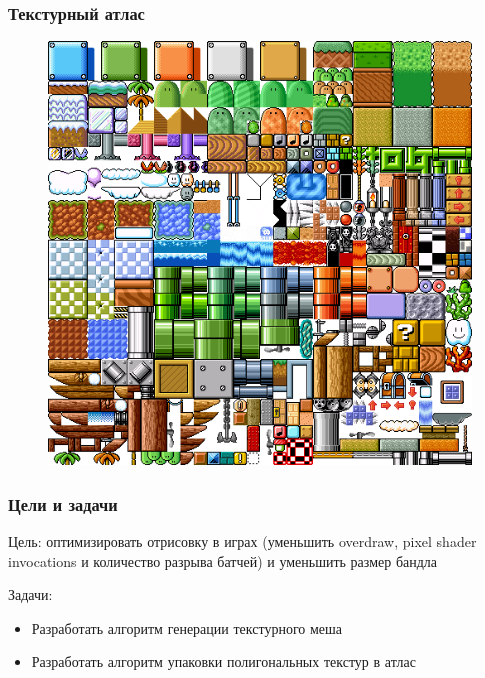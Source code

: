 \documentclass[10pt, unicode]{beamer}
\begin{document}
    \begin{frame}
        \frametitle{Текстурный атлас}
        \begin{figure}[H]
            \centering
            \includegraphics[scale=0.2]{texture_atlas_example.png}
        \end{figure}
    \end{frame}
    \begin{frame}
        \frametitle{Цели и задачи}
        Цель: оптимизировать отрисовку в играх (уменьшить overdraw, pixel shader invocations и количество разрыва батчей) и уменьшить размер бандла

        Задачи:
        \begin{itemize}
            \item Разработать алгоритм генерации текстурного меша
            \item Разработать алгоритм упаковки полигональных текстур в атлас
        \end{itemize}
    \end{frame}
\end{document}
